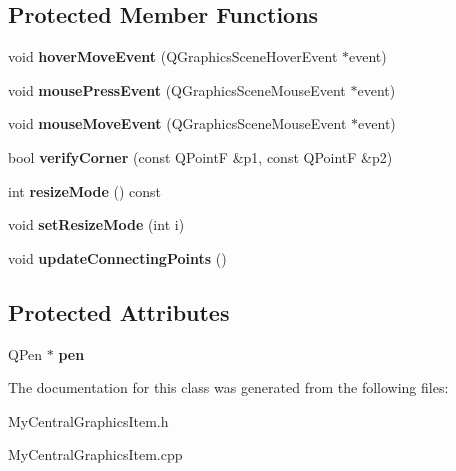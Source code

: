 \subsection*{Protected Member Functions}
\begin{DoxyCompactItemize}
\item 
\hypertarget{class_my_central_graphics_item_a37c26b04ff0579568550e479aca6b4c7}{}void {\bfseries hover\+Move\+Event} (Q\+Graphics\+Scene\+Hover\+Event $\ast$event)\label{class_my_central_graphics_item_a37c26b04ff0579568550e479aca6b4c7}

\item 
\hypertarget{class_my_central_graphics_item_ac2eca49285c8f2058c8faab20ec46b48}{}void {\bfseries mouse\+Press\+Event} (Q\+Graphics\+Scene\+Mouse\+Event $\ast$event)\label{class_my_central_graphics_item_ac2eca49285c8f2058c8faab20ec46b48}

\item 
\hypertarget{class_my_central_graphics_item_a6b3c312c410910a45e0883e728312f3c}{}void {\bfseries mouse\+Move\+Event} (Q\+Graphics\+Scene\+Mouse\+Event $\ast$event)\label{class_my_central_graphics_item_a6b3c312c410910a45e0883e728312f3c}

\item 
\hypertarget{class_my_central_graphics_item_aa0d27bc8f661136a54a61e12d79e2386}{}bool {\bfseries verify\+Corner} (const Q\+Point\+F \&p1, const Q\+Point\+F \&p2)\label{class_my_central_graphics_item_aa0d27bc8f661136a54a61e12d79e2386}

\item 
\hypertarget{class_my_central_graphics_item_a7616ccc14383191dd0c69a0a3b3e4e2c}{}int {\bfseries resize\+Mode} () const \label{class_my_central_graphics_item_a7616ccc14383191dd0c69a0a3b3e4e2c}

\item 
\hypertarget{class_my_central_graphics_item_a37551f69c8e31e601036ceef0cc16a40}{}void {\bfseries set\+Resize\+Mode} (int i)\label{class_my_central_graphics_item_a37551f69c8e31e601036ceef0cc16a40}

\item 
\hypertarget{class_my_central_graphics_item_a3b8c5b13546c1f1e9eba541abe1aa89c}{}void {\bfseries update\+Connecting\+Points} ()\label{class_my_central_graphics_item_a3b8c5b13546c1f1e9eba541abe1aa89c}

\end{DoxyCompactItemize}
\subsection*{Protected Attributes}
\begin{DoxyCompactItemize}
\item 
\hypertarget{class_my_central_graphics_item_a64d9cd163863d34aa141ce8103dd8ec0}{}Q\+Pen $\ast$ {\bfseries pen}\label{class_my_central_graphics_item_a64d9cd163863d34aa141ce8103dd8ec0}

\end{DoxyCompactItemize}


The documentation for this class was generated from the following files\+:\begin{DoxyCompactItemize}
\item 
My\+Central\+Graphics\+Item.\+h\item 
My\+Central\+Graphics\+Item.\+cpp\end{DoxyCompactItemize}
